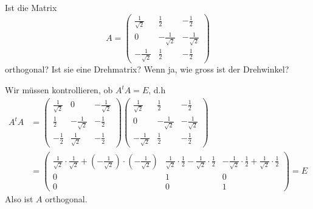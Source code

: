 Ist die Matrix
\[
A=
\begin{pmatrix}
\frac1{\sqrt{2}}&\frac12&-\frac12\\
0&-\frac1{\sqrt{2}}&-\frac1{\sqrt{2}}\\
-\frac1{\sqrt{2}}&\frac12&-\frac12
\end{pmatrix}
\]
orthogonal? Ist sie eine Drehmatrix?  Wenn ja, wie gross ist der Drehwinkel?

\begin{loesung}
Wir müssen kontrollieren, ob $A^tA=E$, d.h
\begin{align*}
A^tA&=
\begin{pmatrix}
\frac1{\sqrt{2}}&0&-\frac1{\sqrt{2}}\\
\frac12&-\frac1{\sqrt{2}}&-\frac12\\
-\frac12&\frac1{\sqrt{2}}&-\frac12
\end{pmatrix}
\begin{pmatrix}
\frac1{\sqrt{2}}&\frac12&-\frac12\\
0&-\frac1{\sqrt{2}}&-\frac1{\sqrt{2}}\\
-\frac1{\sqrt{2}}&\frac12&-\frac12
\end{pmatrix}
\\
&=
\begin{pmatrix}
\frac1{\sqrt{2}}\cdot\frac1{\sqrt{2}} + (-\frac1{\sqrt{2}})\cdot(-\frac1{\sqrt{2}})
        &\frac1{\sqrt{2}}\cdot\frac12-\frac1{\sqrt{2}}\cdot\frac12
                &-\frac1{\sqrt{2}}\cdot\frac12+\frac1{\sqrt{2}}\cdot\frac12\\
0&1&0\\
0&0&1
\end{pmatrix}=E
\end{align*}
Also ist $A$ orthogonal.


\end{loesung}

